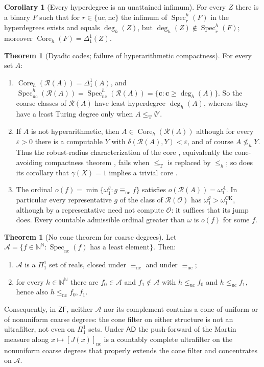 \documentclass[11pt,letterpaper]{article}
\theoremstyle{definition}
\newtheorem{theorem}[definition]{Theorem}
\newtheorem{corollary}[definition]{Corollary}
\numberwithin{equation}{section}
\newcommand{\N}{\mathbb N}
\newcommand{\Baire}{\N^{\N}}
\newcommand{\leT}{\le_{\mathrm T}}
\newcommand{\lenc}{\le_{\mathrm{nc}}}
\newcommand{\leuc}{\le_{\mathrm{uc}}}
\newcommand{\eqnc}{\equiv_{\mathrm{nc}}}
\newcommand{\equc}{\equiv_{\mathrm{uc}}}
\newcommand{\nc}{\mathrm{nc}}
\newcommand{\uc}{\mathrm{uc}}
\newcommand{\Spec}{\operatorname{Spec}}
\newcommand{\J}{J}
\newcommand{\Rc}{\mathcal R}
\newcommand{\leh}{\le_{h}}
\newcommand{\nleh}{\nleq_{h}}
\newcommand{\Dh}{\Delta^1_1}
\newcommand{\Coreh}{\operatorname{Core}_h}
\newcommand{\Spech}{\operatorname{Spec}^h}
\newcommand{\degh}{\deg_h}
\newcommand{\omck}{\omega_1^{\mathrm{CK}}}
\newcommand{\KO}{\mathcal O}
\begin{document}
\begin{corollary}[Every hyperdegree is an unattained infimum]\label{cor:infimum}
For every $Z$ there is a binary $F$ such that for $r\in\{\uc,\nc\}$ the infimum of $\Spech_r(F)$ in the hyperdegrees exists and equals $\degh(Z)$, but $\degh(Z)\notin\Spech_r(F)$; moreover $\Coreh(F)=\Dh(Z)$.
\end{corollary}

\begin{theorem}[Dyadic codes; failure of hyperarithmetic compactness]\label{thm:C}
For every set $A$:
\begin{enumerate}[label=\textup{(\alph*)}]
\item $\Coreh(\Rc(A))=\Dh(A)$, and $\Spech_{\uc}(\Rc(A))=\Spech_{\nc}(\Rc(A))=\{\mathbf c:\mathbf c\ge\degh(A)\}$. So the coarse classes of $\Rc(A)$ have least hyperdegree $\degh(A)$, whereas they have a least Turing degree only when $A\leT\emptyset'$.
\item If $A$ is not hyperarithmetic, then $A\in\Coreh(\Rc(A))$ although for every $\varepsilon>0$ there is a computable $Y$ with $\delta(\Rc(A),Y)<\varepsilon$, and of course $A\nleh Y$. Thus the robust-radius characterization of the core \cite[Theorem~4.8]{Synthesis}, equivalently the cone-avoiding compactness theorem \cite[Theorem~3.7]{HJKS}, fails when $\leT$ is replaced by $\leh$; so does its corollary that $\gamma(X)=1$ implies a trivial core \cite[Theorem~4.3]{HJKS}.
\item The ordinal $o(f)=\min\{\omega_1^g:g\eqnc f\}$ satisfies $o(\Rc(A))=\omega_1^A$. In particular every representative $g$ of the class of $\Rc(\KO)$ has $\omega_1^g>\omck$, although by \cite[Theorem~6.3]{Synthesis} a representative need not compute $\KO$: it suffices that its jump does. Every countable admissible ordinal greater than $\omega$ is $o(f)$ for some $f$.
\end{enumerate}
\end{theorem}

\begin{theorem}[No cone theorem for coarse degrees]\label{thm:D}
Let $\mathcal A=\{f\in\Baire:\Spec_{\nc}(f)\text{ has a least element}\}$. Then:
\begin{enumerate}[label=\textup{(\alph*)}]
\item $\mathcal A$ is a $\Pi^1_1$ set of reals, closed under $\eqnc$ and under $\equc$;
\item for every $h\in\Baire$ there are $f_0\in\mathcal A$ and $f_1\notin\mathcal A$ with $h\leuc f_0$ and $h\leuc f_1$, hence also $h\lenc f_0,f_1$.
\end{enumerate}
Consequently, in $\mathsf{ZF}$, neither $\mathcal A$ nor its complement contains a cone of uniform or of nonuniform coarse degrees: the cone filter on either structure is not an ultrafilter, not even on $\Pi^1_1$ sets. Under $\mathsf{AD}$ the push-forward of the Martin measure along $x\mapsto[\J(x)]_{\nc}$ is a countably complete ultrafilter on the nonuniform coarse degrees that properly extends the cone filter and concentrates on $\mathcal A$.
\end{theorem}
\end{document}
